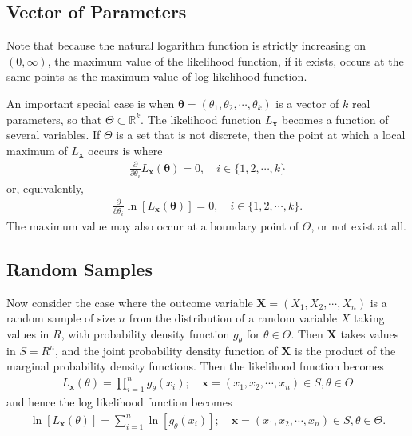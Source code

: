 \documentclass[a4paper,12pt]{article}
\theoremstyle{definition}
\theoremstyle{definition}
\theoremstyle{definition}
\newcommand{\bs}{\boldsymbol}
\begin{document}
    \subsection{Vector of Parameters}
    Note that because the natural logarithm function is strictly increasing on $(0, \infty)$, the maximum value of the likelihood function, if it exists, occurs at the same points as the maximum value of log likelihood function. \par
    An important special case is when $\bs{\theta} = (\theta_1, \theta_2, \cdots, \theta_k)$ is a vector of $k$ real parameters, so that $\Theta \subset \mathbb{R}^k$. The likelihood function $L_{\bs{x}}$ becomes a function of several variables. If $\Theta$ is a set that is not discrete, then the point at which a local maximum of $L_{\bs{x}}$ occurs is where
    \begin{align*}
        \frac{\partial}{\partial \theta_i} L_{\bs{x}}(\bs{\theta}) = 0, \quad i \in \{1, 2, \cdots, k\}
    \end{align*}
    or, equivalently,
    \begin{align*}
        \frac{\partial}{\partial \theta_i} \ln[L_{\bs{x}}(\bs{\theta})] = 0, \quad i \in \{1, 2, \cdots, k\}.
    \end{align*}
    The maximum value may also occur at a boundary point of $\Theta$, or not exist at all. \par

    \subsection{Random Samples}
    Now consider the case where the outcome variable $\bs{X} = (X_1, X_2, \cdots, X_n)$ is a random sample of size $n$ from the distribution of a random variable $X$ taking values in $R$, with probability density function $g_\theta$ for $\theta \in \Theta$. Then $\bs{X}$ takes values in $S = R^n$, and the joint probability density function of $\bs{X}$ is the product of the marginal probability density functions. Then the likelihood function becomes
    \begin{align*}
        L_{\bs{x}}(\theta) = \prod_{i = 1}^n g_\theta(x_i); \quad \bs{x} = (x_1, x_2, \cdots, x_n) \in S, \theta \in \Theta
    \end{align*}
    and hence the log likelihood function becomes
    \begin{align*}
        \ln[L_{\bs{x}}(\theta)] = \sum_{i = 1}^n \ln[g_\theta(x_i)]; \quad \bs{x} = (x_1, x_2, \cdots, x_n) \in S, \theta \in \Theta.
    \end{align*}
\end{document}
